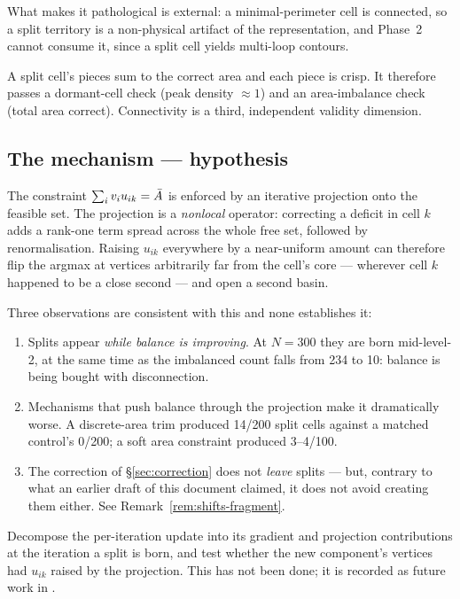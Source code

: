\documentclass[11pt,a4paper]{article}
\begin{document}
What makes it pathological is external: a minimal-perimeter cell is connected, so
a split territory is a non-physical artifact of the representation, and Phase~2
cannot consume it, since a split cell yields multi-loop contours.

\begin{remark}
A split cell's pieces sum to the correct area and each piece is crisp. It
therefore passes a dormant-cell check (peak density $\approx 1$) and an
area-imbalance check (total area correct). Connectivity is a third, independent
validity dimension.
\end{remark}

\subsection{The mechanism --- hypothesis}

The constraint $\sum_i v_i u_{ik} = \bar{A}$ is enforced by an iterative projection
onto the feasible set. The projection is a \emph{nonlocal} operator: correcting a
deficit in cell $k$ adds a rank-one term spread across the whole free set,
followed by renormalisation. Raising $u_{ik}$ everywhere by a near-uniform amount
can therefore flip the argmax at vertices arbitrarily far from the cell's core ---
wherever cell $k$ happened to be a close second --- and open a second basin.

Three observations are consistent with this and none establishes it:
\begin{enumerate}\itemsep2pt
  \item Splits appear \emph{while balance is improving}. At $N=300$ they are born
    mid-level-2, at the same time as the imbalanced count falls from 234 to 10:
    balance is being bought with disconnection.
  \item Mechanisms that push balance through the projection make it dramatically
    worse. A discrete-area trim produced 14/200 split cells against a matched
    control's 0/200; a soft area constraint produced 3--4/100.
  \item The correction of \S\ref{sec:correction} does not \emph{leave} splits ---
    but, contrary to what an earlier draft of this document claimed, it does not
    avoid creating them either. See Remark~\ref{rem:shifts-fragment}.
\end{enumerate}

\begin{remark}
Decompose the per-iteration update into its gradient and projection contributions
at the iteration a split is born, and test whether the new component's vertices had
$u_{ik}$ raised by the projection. This has not been done; it is recorded as future
work in .
\end{remark}
\end{document}
